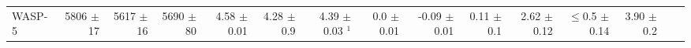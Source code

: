 \begin{sidewaystable*}[t!]
{\begin{tabular}{l r r r r r r r r r r r r r r}




WASP-5  
& 5806  $\pm$ 17
&  5617  $\pm$ 16
&  5690 $\pm$ 80
& 4.58  $\pm$ 0.01
&  4.28  $\pm$ 0.9
&  4.39  $\pm$ 0.03 $^1$ 
&  0.0  $\pm$ 0.01 
& -0.09  $\pm$ 0.01
&  0.11  $\pm$ 0.1
&  2.62  $\pm$ 0.12
&  $\leq$0.5  $\pm$ 0.14
&  3.90  $\pm$ 0.2 \\





\end{tabular}}
\end{sidewaystable*}
